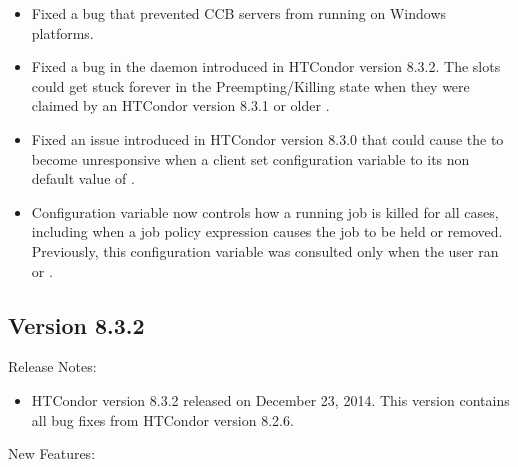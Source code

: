\begin{itemize}

\item Fixed a bug that prevented CCB servers from running on Windows platforms.

\item Fixed a bug in the  daemon introduced in HTCondor 
version 8.3.2.
The  slots could get stuck
forever in the Preempting/Killing state when they were claimed by 
an HTCondor version 8.3.1 or older .

\item Fixed an issue introduced in HTCondor version 8.3.0
that could cause the  to become unresponsive when a client 
set configuration variable  
to its non default value of .

\item Configuration variable  now
controls how a running job is killed for all cases,
including when a job policy expression causes the job to be held or removed.
Previously, this configuration variable was consulted only 
when the user ran  or .

\end{itemize}

\subsection*{\label{sec:New-8-3-2}Version 8.3.2}

\noindent Release Notes:

\begin{itemize}

\item HTCondor version 8.3.2 released on December 23, 2014.
This version contains all bug fixes from HTCondor version 8.2.6.

\end{itemize}


\noindent New Features:

